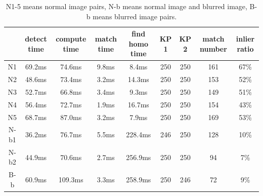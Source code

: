 \documentclass[10pt,conference,compsocconf]{IEEEtran}
\newcommand\tabhead[1]{\small\textbf{#1}}
\begin{document}
\begin{table}[!ht]
  \centering
  \begin{tabular}{|c|c|c|c|c|c|c|c|c|}
    \hline
    \tabhead{ }&
    \multicolumn{1}{|p{0.05\columnwidth}|}{\centering\tabhead{detect time}} &
    \multicolumn{1}{|p{0.05\columnwidth}|}{\centering\tabhead{compute time}}&
    \multicolumn{1}{|p{0.05\columnwidth}|}{\centering\tabhead{match time}}&
    \multicolumn{1}{|p{0.05\columnwidth}|}{\centering\tabhead{find homo time}}&
    \multicolumn{1}{|p{0.05\columnwidth}|}{\centering\tabhead{KP 1}}&
    \multicolumn{1}{|p{0.05\columnwidth}|}{\centering\tabhead{KP 2}}&
    \multicolumn{1}{|p{0.05\columnwidth}|}{\centering\tabhead{match number}}&
    \multicolumn{1}{|p{0.05\columnwidth}|}{\centering\tabhead{inlier ratio}} \\
    \hline
    N1&	69.2ms&	74.6ms&	9.8ms&	8.4ms&	250&	250&	161&	67\%\\
    \hline
    N2&	48.6ms&	73.4ms&	3.2ms&	14.3ms&	250&	250&	153&	52\%\\
    \hline
    N3&	52.7ms&	66.8ms&	3.4ms&	9.3ms&	250&	250&	149&	51\%\\
    \hline
    N4&	56.4ms&	72.7ms&	1.9ms&	16.7ms&	250&	250&	154&	43\%\\
    \hline
    N5&	68.7ms&	87.0ms&	3.2ms&	7.9ms&	250&	250&	169&	53\%\\
    \hline
    N-b1&	36.2ms&	76.7ms&	5.5ms&	228.4ms&	246&	250&	128&	10\%\\
    \hline
    N-b2&	44.9ms&	70.6ms&	2.7ms&	256.9ms&	250&	250&	94&	7\%\\
    \hline
    B-b&	60.9ms&	109.3ms&	3.3ms&	258.9ms&	250&	246&	72&	9\%\\
    \hline
  \end{tabular}
  \caption{N1-5 means normal image pairs, N-b means normal image and blurred image, B-b means blurred image pairs.}
  \label{tab:table1}
\end{table}
\end{document}
